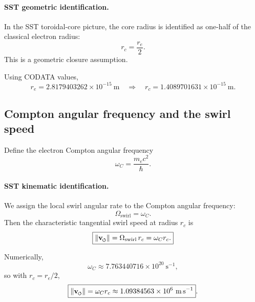 \documentclass[11pt]{article}
\newcommand{\vswirl}{\mathbf{v}_{\mkern-2mu\scriptscriptstyle\boldsymbol{\circlearrowleft}}}
\newcommand{\rc}{r_c}                                    %
\begin{document}
        \paragraph{SST geometric identification.}
            In the SST toroidal-core picture, the core radius is identified as one-half of the classical electron radius:
            \begin{equation}
                \boxed{\rc=\frac{r_e}{2}}.
                \label{eq:rc-from-re}
            \end{equation}
            This is a geometric closure assumption.
            
            Using CODATA values,
            \[
                r_e = 2.8179403262\times 10^{-15}\ \mathrm{m}
                \quad\Rightarrow\quad
                \boxed{\rc = 1.4089701631\times 10^{-15}\ \mathrm{m}}.
            \]
    
    \subsection{Compton angular frequency and the swirl speed}
    Define the electron Compton angular frequency
    \begin{equation}
        \omega_C = \frac{m_e c^2}{\hbar}.
        \label{eq:omegaC}
    \end{equation}
    
    \paragraph{SST kinematic identification.}
        We assign the local swirl angular rate to the Compton angular frequency:
        \begin{equation}
            \Omega_{\text{swirl}}=\omega_C.
            \label{eq:OmegaSwirl-omegaC}
        \end{equation}
        Then the characteristic tangential swirl speed at radius \(\rc\) is
        \begin{equation}
            \boxed{\lVert \vswirl\rVert = \Omega_{\text{swirl}}\,\rc = \omega_C \rc.}
            \label{eq:vswirl-from-omegaC-rc}
        \end{equation}
        
        Numerically,
        \[
            \omega_C \approx 7.763440716\times 10^{20}\ \mathrm{s^{-1}},
        \]
        so with \(\rc=r_e/2\),
        \[
            \boxed{
                \lVert \vswirl\rVert
                = \omega_C \rc
                \approx 1.09384563\times 10^6\ \mathrm{m\,s^{-1}}
            }.
        \]
    
\end{document}
